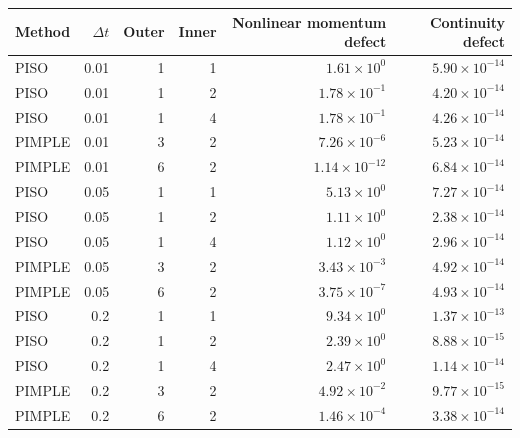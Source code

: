 \begin{center}\small
\begin{tabular}{lrrrrr}\toprule
Method & $\Delta t$ & Outer & Inner & Nonlinear momentum defect & Continuity defect\\\midrule
PISO & 0.01 & 1 & 1 & $1.61\times10^{0}$ & $5.90\times10^{-14}$\\
PISO & 0.01 & 1 & 2 & $1.78\times10^{-1}$ & $4.20\times10^{-14}$\\
PISO & 0.01 & 1 & 4 & $1.78\times10^{-1}$ & $4.26\times10^{-14}$\\
PIMPLE & 0.01 & 3 & 2 & $7.26\times10^{-6}$ & $5.23\times10^{-14}$\\
PIMPLE & 0.01 & 6 & 2 & $1.14\times10^{-12}$ & $6.84\times10^{-14}$\\
PISO & 0.05 & 1 & 1 & $5.13\times10^{0}$ & $7.27\times10^{-14}$\\
PISO & 0.05 & 1 & 2 & $1.11\times10^{0}$ & $2.38\times10^{-14}$\\
PISO & 0.05 & 1 & 4 & $1.12\times10^{0}$ & $2.96\times10^{-14}$\\
PIMPLE & 0.05 & 3 & 2 & $3.43\times10^{-3}$ & $4.92\times10^{-14}$\\
PIMPLE & 0.05 & 6 & 2 & $3.75\times10^{-7}$ & $4.93\times10^{-14}$\\
PISO & 0.2 & 1 & 1 & $9.34\times10^{0}$ & $1.37\times10^{-13}$\\
PISO & 0.2 & 1 & 2 & $2.39\times10^{0}$ & $8.88\times10^{-15}$\\
PISO & 0.2 & 1 & 4 & $2.47\times10^{0}$ & $1.14\times10^{-14}$\\
PIMPLE & 0.2 & 3 & 2 & $4.92\times10^{-2}$ & $9.77\times10^{-15}$\\
PIMPLE & 0.2 & 6 & 2 & $1.46\times10^{-4}$ & $3.38\times10^{-14}$\\
\bottomrule\end{tabular}\end{center}
